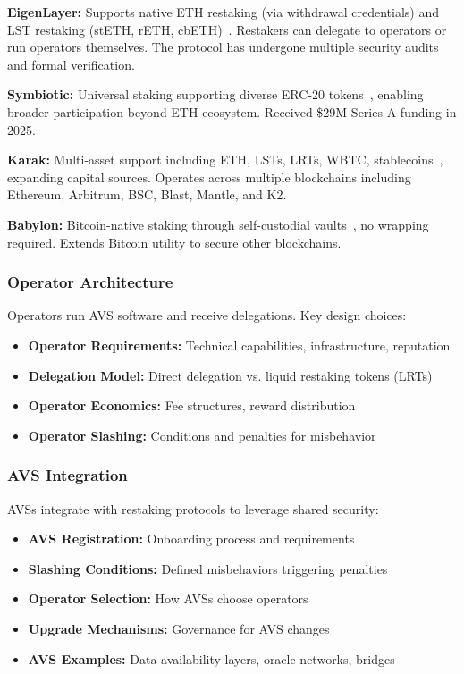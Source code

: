 \documentclass[runningheads]{llncs}
\begin{document}
\textbf{EigenLayer:} Supports native ETH restaking (via withdrawal credentials) and LST restaking (stETH, rETH, cbETH)~\cite{eigenlayer2024,eigenlayerwhitepaper2023}. Restakers can delegate to operators or run operators themselves. The protocol has undergone multiple security audits~\cite{certora2025,code4rena2023} and formal verification.

\textbf{Symbiotic:} Universal staking supporting diverse ERC-20 tokens~\cite{symbiotic2024,symbioticwhitepaper2024}, enabling broader participation beyond ETH ecosystem. Received \$29M Series A funding in 2025.

\textbf{Karak:} Multi-asset support including ETH, LSTs, LRTs, WBTC, stablecoins~\cite{karak2024}, expanding capital sources. Operates across multiple blockchains including Ethereum, Arbitrum, BSC, Blast, Mantle, and K2.

\textbf{Babylon:} Bitcoin-native staking through self-custodial vaults~\cite{babylon2024}, no wrapping required. Extends Bitcoin utility to secure other blockchains.

\subsubsection{Operator Architecture}

Operators run AVS software and receive delegations. Key design choices:
\begin{itemize}
    \item \textbf{Operator Requirements:} Technical capabilities, infrastructure, reputation
    \item \textbf{Delegation Model:} Direct delegation vs. liquid restaking tokens (LRTs)
    \item \textbf{Operator Economics:} Fee structures, reward distribution
    \item \textbf{Operator Slashing:} Conditions and penalties for misbehavior
\end{itemize}

\subsubsection{AVS Integration}

AVSs integrate with restaking protocols to leverage shared security:
\begin{itemize}
    \item \textbf{AVS Registration:} Onboarding process and requirements
    \item \textbf{Slashing Conditions:} Defined misbehaviors triggering penalties~\cite{certora2025,durvasula2024robust}
    \item \textbf{Operator Selection:} How AVSs choose operators
    \item \textbf{Upgrade Mechanisms:} Governance for AVS changes
    \item \textbf{AVS Examples:} Data availability layers, oracle networks, bridges~\cite{zhang2024proof,das2025reliablocks}
\end{itemize}
\end{document}
